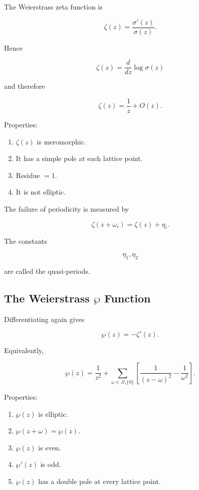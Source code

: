 \documentclass[12pt,a4paper]{article}
\theoremstyle{notespace}
\begin{document}
The Weierstrass zeta function is

\[
\zeta(z)
=
\frac{\sigma'(z)}{\sigma(z)}.
\]

Hence

\[
\boxed{
	\zeta(z)
	=
	\frac{d}{dz}
	\log\sigma(z)
}
\]

and therefore

\[
\zeta(z)
=
\frac1z+O(z).
\]

Properties:

\begin{enumerate}
	\item \(\zeta(z)\) is meromorphic.
	
	\item It has a simple pole at each lattice point.
	
	\item Residue \(=1\).
	
	\item It is not elliptic.
\end{enumerate}

The failure of periodicity is measured by

\[
\zeta(z+\omega_i)
=
\zeta(z)+\eta_i.
\]

The constants

\[
\eta_1,\eta_2
\]

are called the quasi-periods.

\subsection{The Weierstrass \texorpdfstring{\(\wp\)}{wp} Function}

Differentiating again gives

\[
\wp(z)
=
-\zeta'(z).
\]

Equivalently,

\[
\boxed{
	\wp(z)
	=
	\frac1{z^2}
	+
	\sum_{\omega\in\Lambda\setminus\{0\}}
	\left[
	\frac1{(z-\omega)^2}
	-
	\frac1{\omega^2}
	\right].
}
\]

Properties:

\begin{enumerate}
	\item \(\wp(z)\) is elliptic.
	
	\item \(\wp(z+\omega)=\wp(z)\).
	
	\item \(\wp(z)\) is even.
	
	\item \(\wp'(z)\) is odd.
	
	\item \(\wp(z)\) has a double pole at every lattice point.
\end{enumerate}
\end{document}
